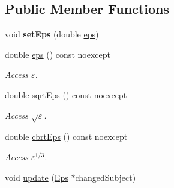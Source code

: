 \subsection*{Public Member Functions}
\begin{DoxyCompactItemize}
\item 
void {\bfseries set\+Eps} (double \hyperlink{classSpacy_1_1Mixin_1_1Eps_a40e2ba8f3abd2b5370ef41238cfaaf8b}{eps})\hypertarget{classSpacy_1_1Mixin_1_1Eps_a1bbfd62541610d5d80f2782ab77158e4}{}\label{classSpacy_1_1Mixin_1_1Eps_a1bbfd62541610d5d80f2782ab77158e4}

\item 
double \hyperlink{classSpacy_1_1Mixin_1_1Eps_a40e2ba8f3abd2b5370ef41238cfaaf8b}{eps} () const noexcept\hypertarget{classSpacy_1_1Mixin_1_1Eps_a40e2ba8f3abd2b5370ef41238cfaaf8b}{}\label{classSpacy_1_1Mixin_1_1Eps_a40e2ba8f3abd2b5370ef41238cfaaf8b}

\begin{DoxyCompactList}\small\item\em Access $\varepsilon$. \end{DoxyCompactList}\item 
double \hyperlink{classSpacy_1_1Mixin_1_1Eps_a29e8c25dc3f1fdede57b8eb06f520fe1}{sqrt\+Eps} () const noexcept\hypertarget{classSpacy_1_1Mixin_1_1Eps_a29e8c25dc3f1fdede57b8eb06f520fe1}{}\label{classSpacy_1_1Mixin_1_1Eps_a29e8c25dc3f1fdede57b8eb06f520fe1}

\begin{DoxyCompactList}\small\item\em Access $\sqrt\varepsilon$. \end{DoxyCompactList}\item 
double \hyperlink{classSpacy_1_1Mixin_1_1Eps_a1879ebbf1b467cb4be36bcc63307018d}{cbrt\+Eps} () const noexcept\hypertarget{classSpacy_1_1Mixin_1_1Eps_a1879ebbf1b467cb4be36bcc63307018d}{}\label{classSpacy_1_1Mixin_1_1Eps_a1879ebbf1b467cb4be36bcc63307018d}

\begin{DoxyCompactList}\small\item\em Access $\varepsilon^{1/3}$. \end{DoxyCompactList}\item 
void \hyperlink{classSpacy_1_1Mixin_1_1Eps_a151216968daef3da5f5cdc0b957ce01b}{update} (\hyperlink{classSpacy_1_1Mixin_1_1Eps_a51dbe0b9cc950e0f3dfd34a481f08ae4}{Eps} $\ast$changed\+Subject)\hypertarget{classSpacy_1_1Mixin_1_1Eps_a151216968daef3da5f5cdc0b957ce01b}{}\label{classSpacy_1_1Mixin_1_1Eps_a151216968daef3da5f5cdc0b957ce01b}


\end{DoxyCompactItemize}
